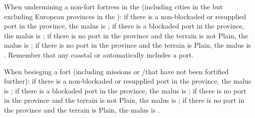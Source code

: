  When undermining a non-fort fortress in
the \ROTW (including cities in the \ROTW but excluding European provinces in
the \ROTW):
\bparag if there is a non-blockaded or resupplied port in the province, the
malus is ;
\bparag if there is a blockaded port in the province, the malus is ;
\bparag if there is no port in the province and the terrain is not Plain, the
malus is ;
\bparag if there is no port in the province and the terrain is Plain, the
malus is .
\bparag Remember that any coastal \COL or \TP automatically includes a port.

 When besieging a fort (including missions or
\COL/\TP that have not been fortified further):
\bparag if there is a non-blockaded or resupplied port in the province, the
malus is ;
\bparag if there is a blockaded port in the province, the malus is ;
\bparag if there is no port in the province and the terrain is not Plain, the
malus is ;
\bparag if there is no port in the province and the terrain is Plain, the
malus is .

